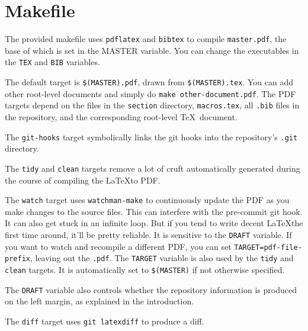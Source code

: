 \section{Makefile}

The provided makefile uses \texttt{pdflatex} and \texttt{bibtex} to compile \texttt{master.pdf}, the base of which is set in the MASTER variable.
You can change the executables in the \texttt{TEX} and \texttt{BIB} variables.

The default target is \texttt{\$(MASTER).pdf}, drawn from \texttt{\$(MASTER).tex}.
You can add other root-level documents and simply do \texttt{make other-document.pdf}.
The PDF targets depend on the files in the \texttt{section} directory, \texttt{macros.tex}, all \texttt{.bib} files in the repository, and the corresponding root-level \TeX\ document.

The \texttt{git-hooks} target symbolically links the git hooks into the repository's \texttt{.git} directory.

The \texttt{tidy} and \texttt{clean} targets remove a lot of cruft automatically generated during the course of compiling the \LaTeX to PDF.

The \texttt{watch} target uses \texttt{watchman-make}\cite{watchman} to continuously update the PDF as you make changes to the source files.
This can interfere with the pre-commit git hook.
It can also get stuck in an infinite loop.
But if you tend to write decent \LaTeX the first time around, it'll be pretty reliable.
It is sensitive to the \texttt{DRAFT} variable.
If you want to watch and recompile a different PDF, you can set \texttt{TARGET=pdf-file-prefix}, leaving out the \texttt{.pdf}.
The \texttt{TARGET} variable is also used by the \texttt{tidy} and \texttt{clean} targets.
It is automatically set to \texttt{\$(MASTER)} if not otherwise specified.

The \texttt{DRAFT} variable also controls whether the \git repository information is produced on the left margin, as explained in the introduction.

The \texttt{diff} target uses \texttt{git latexdiff} to produce a diff\cite{git-latexdiff}.